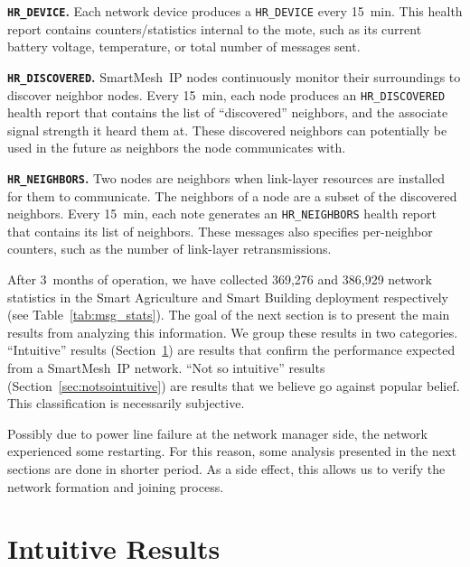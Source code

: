 \documentclass{elsarticle}
\newcommand{\smip}                {SmartMesh~IP\xspace}
\newcommand{\building}            {Smart Building\xspace}
\newcommand{\agri}                {Smart Agriculture\xspace}
\newcommand{\HRNEIGHBORS}         {{\tt HR\_NEIGHBORS}\xspace}
\newcommand{\HRDISCOVERED}        {{\tt HR\_DISCOVERED}\xspace}
\newcommand{\HRDEVICE}            {{\tt HR\_DEVICE}\xspace}
\newcommand{\PEACHNUMSTATS}       {369,276\xspace}
\newcommand{\EVANUMSTATS}         {386,929\xspace}
\begin{document}
\textbf{\HRDEVICE.}
Each network device produces a \HRDEVICE every 15~min.
This health report contains counters/statistics internal to the mote, such as its current battery voltage, temperature, or total number of messages sent.

\textbf{\HRDISCOVERED.}
\smip nodes continuously monitor their surroundings to discover neighbor nodes.
Every 15~min, each node produces an \HRDISCOVERED health report that contains the list of ``discovered'' neighbors, and the associate signal strength it heard them at.
These discovered neighbors can potentially be used in the future as neighbors the node communicates with.

\textbf{\HRNEIGHBORS.}
Two nodes are neighbors when link-layer resources are installed for them to communicate.
The neighbors of a node are a subset of the discovered neighbors.
Every 15~min, each note generates an \HRNEIGHBORS health report that contains its list of neighbors.
These messages also specifies per-neighbor counters, such as the number of link-layer retransmissions.


After 3~months of operation, we have collected \PEACHNUMSTATS and \EVANUMSTATS network statistics in the \agri and \building deployment respectively (see Table~\ref{tab:msg_stats}).
The goal of the next section is to present the main results from analyzing this information.
We group these results in two categories.
``Intuitive'' results (Section~\ref{sec:intuitive}) are results that confirm the performance expected from a \smip network.
``Not so intuitive'' results (Section~\ref{sec:notsointuitive}) are results that we believe go against popular belief.
This classification is necessarily subjective.

Possibly due to power line failure at the network manager side, the network experienced some restarting.
For this reason, some analysis presented in the next sections are done in shorter period.
As a side effect, this allows us to verify the network formation and joining process.

\section{Intuitive Results}
\label{sec:intuitive}
\end{document}
